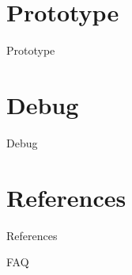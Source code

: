\documentclass{beamer}
\begin{document}
\section{Prototype}
\begin{frame}{Prototype}
\end{frame}

\section{Debug}
\begin{frame}{Debug}
\end{frame}


\section{References}
\begin{frame}[t,allowframebreaks]{References}
  \nocite{*}
  \RaggedRight
  \printbibliography
\end{frame}


\begin{frame}{FAQ}

\end{frame}
\end{document}
